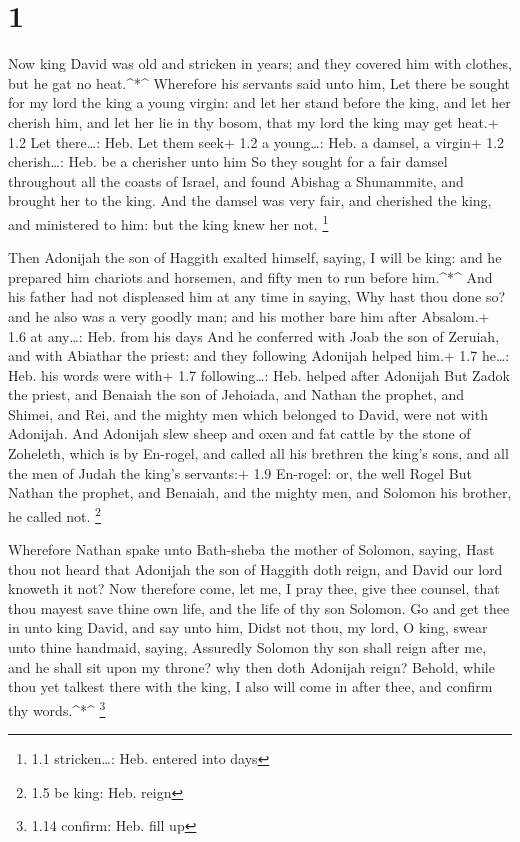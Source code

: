 \hypertarget{section}{%
\section{1}\label{section}}

 Now king David was old and stricken in years; and they
covered him with clothes, but he gat no heat.\^{}*\^{} 
Wherefore his servants said unto him, Let there be sought for my lord
the king a young virgin: and let her stand before the king, and let her
cherish him, and let her lie in thy bosom, that my lord the king may get
heat.+ 1.2 Let there\ldots: Heb. Let them seek+ 1.2 a young\ldots: Heb.
a damsel, a virgin+ 1.2 cherish\ldots: Heb. be a cherisher unto him
 So they sought for a fair damsel throughout all the coasts
of Israel, and found Abishag a Shunammite, and brought her to the king.
 And the damsel was very fair, and cherished the king, and
ministered to him: but the king knew her not. \footnote{1.1
  stricken\ldots: Heb. entered into days}

 Then Adonijah the son of Haggith exalted himself, saying, I
will be king: and he prepared him chariots and horsemen, and fifty men
to run before him.\^{}*\^{}  And his father had not
displeased him at any time in saying, Why hast thou done so? and he also
was a very goodly man; and his mother bare him after Absalom.+ 1.6 at
any\ldots: Heb. from his days  And he conferred with Joab
the son of Zeruiah, and with Abiathar the priest: and they following
Adonijah helped him.+ 1.7 he\ldots: Heb. his words were with+ 1.7
following\ldots: Heb. helped after Adonijah  But Zadok the
priest, and Benaiah the son of Jehoiada, and Nathan the prophet, and
Shimei, and Rei, and the mighty men which belonged to David, were not
with Adonijah.  And Adonijah slew sheep and oxen and fat
cattle by the stone of Zoheleth, which is by En-rogel, and called all
his brethren the king's sons, and all the men of Judah the king's
servants:+ 1.9 En-rogel: or, the well Rogel  But Nathan the
prophet, and Benaiah, and the mighty men, and Solomon his brother, he
called not. \footnote{1.5 be king: Heb. reign}

 Wherefore Nathan spake unto Bath-sheba the mother of
Solomon, saying, Hast thou not heard that Adonijah the son of Haggith
doth reign, and David our lord knoweth it not?  Now
therefore come, let me, I pray thee, give thee counsel, that thou mayest
save thine own life, and the life of thy son Solomon.  Go
and get thee in unto king David, and say unto him, Didst not thou, my
lord, O king, swear unto thine handmaid, saying, Assuredly Solomon thy
son shall reign after me, and he shall sit upon my throne? why then doth
Adonijah reign?  Behold, while thou yet talkest there with
the king, I also will come in after thee, and confirm thy
words.\^{}*\^{} \footnote{1.14 confirm: Heb. fill up}

